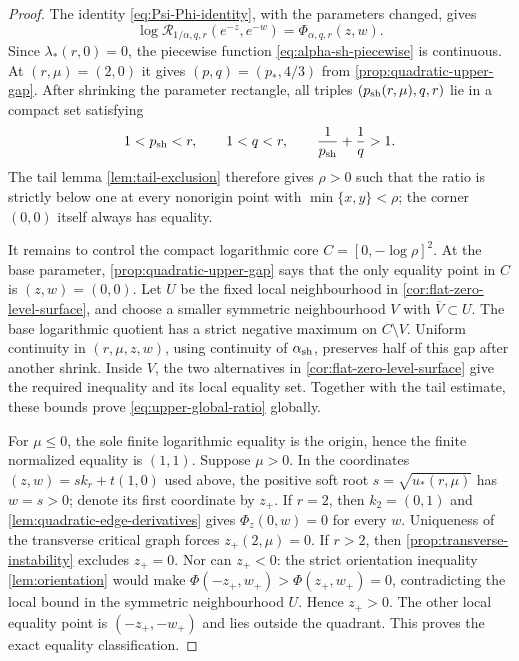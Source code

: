 \documentclass[11pt,reqno]{amsart}
\numberwithin{equation}{section}
\theoremstyle{definition}
\theoremstyle{remark}
\begin{document}
\begin{proof}
The identity \eqref{eq:Psi-Phi-identity}, with the parameters changed, gives
\begin{equation}\label{eq:upper-Phi-ratio}
  \log\mathcal R_{1/\alpha,q,r}(e^{-z},e^{-w})
  =\Phi_{\alpha,q,r}(z,w).
\end{equation}
Since $\lambda_*(r,0)=0$, the piecewise function
\eqref{eq:alpha-sh-piecewise} is continuous.  At $(r,\mu)=(2,0)$ it gives
$(p,q)=(p_*,4/3)$ from \cref{prop:quadratic-upper-gap}.  After shrinking the
parameter rectangle, all triples
$(p_{\rm sh}(r,\mu),q,r)$ lie in a compact set satisfying
\[
  1<p_{\rm sh}<r,\qquad 1<q<r,\qquad
  \frac1{p_{\rm sh}}+\frac1q>1.
\]
The tail lemma \cref{lem:tail-exclusion} therefore gives $\rho>0$ such that
the ratio is strictly below one at every nonorigin point with
$\min\{x,y\}<\rho$; the corner $(0,0)$ itself always has equality.

It remains to control the compact logarithmic core
$C=[0,-\log\rho]^2$.  At the base parameter,
\cref{prop:quadratic-upper-gap} says that the only equality point in $C$ is
$(z,w)=(0,0)$.  Let $U$ be the fixed local neighbourhood in
\cref{cor:flat-zero-level-surface}, and choose a smaller symmetric
neighbourhood $V$ with $\overline V\subset U$.  The base logarithmic quotient
has a strict negative maximum on $C\setminus V$.  Uniform continuity in
$(r,\mu,z,w)$, using continuity of $\alpha_{\rm sh}$, preserves half of this
gap after another shrink.  Inside $V$, the two alternatives in
\cref{cor:flat-zero-level-surface} give the required inequality and its local
equality set.  Together with the tail estimate, these bounds prove
\eqref{eq:upper-global-ratio} globally.

For $\mu\le0$, the sole finite logarithmic equality is the origin, hence the
finite normalized equality is $(1,1)$.  Suppose $\mu>0$.  In the coordinates
$(z,w)=sk_r+t(1,0)$ used above, the positive soft root
$s=\sqrt{u_*(r,\mu)}$ has $w=s>0$; denote its first coordinate by $z_+$.  If
$r=2$, then $k_2=(0,1)$ and
\cref{lem:quadratic-edge-derivatives} gives $\Phi_z(0,w)=0$ for every $w$.
Uniqueness of the transverse critical graph forces $z_+(2,\mu)=0$.  If $r>2$,
then \cref{prop:transverse-instability} excludes $z_+=0$.  Nor can $z_+<0$:
the strict orientation inequality \cref{lem:orientation} would make
$\Phi(-z_+,w_+)>\Phi(z_+,w_+)=0$, contradicting the local bound in the symmetric
neighbourhood $U$.  Hence $z_+>0$.  The other local equality point is
$(-z_+,-w_+)$ and lies outside the quadrant.  This proves the exact equality
classification.
\end{proof}
\end{document}
